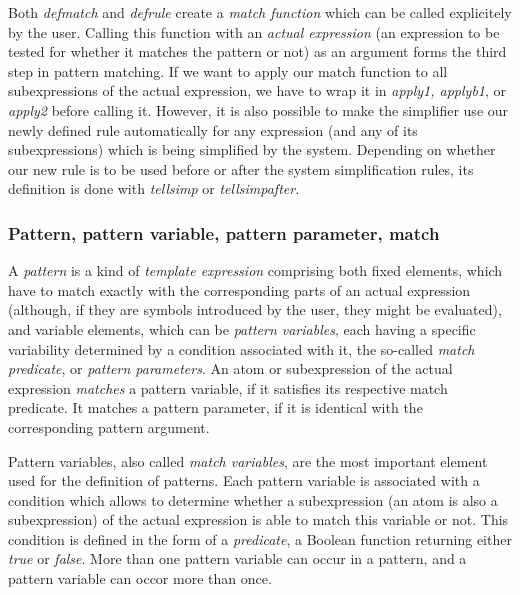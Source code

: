\documentclass[../Maxima_Workbook.tex]{subfiles}
\begin{document}
\lz Both \emph{defmatch} and \emph{defrule} create a \emph{match function} which can be called explicitely by the user. Calling this function with an \emph{actual expression} (an expression to be tested for whether it matches the pattern or not) as an argument forms the third step in pattern matching. If we want to apply our match function to all subexpressions of the actual expression, we have to wrap it in \emph{apply1, applyb1}, or \emph{apply2} before calling it. However, it is also possible to make the simplifier use our newly defined rule automatically for any expression (and any of its subexpressions) which is being simplified by the system. Depending on whether our new rule is to be used before or after the system simplification rules, its definition is done with \emph{tellsimp} or \emph{tellsimpafter}.

\subsubsection{Pattern, pattern variable, pattern parameter, match}

A \emph{pattern} is a kind of \emph{template expression} comprising both fixed elements, which have to match exactly with the corresponding parts of an actual expression (although, if they are symbols introduced by the user, they might be evaluated), and variable elements, which can be \emph{pattern variables}, each having a specific variability determined by a condition associated with it, the so-called \emph{match predicate}, or \emph{pattern parameters}. An atom or subexpression of the actual expression \emph{matches} a pattern variable, if it satisfies its respective match predicate. It matches a pattern parameter, if it is identical with the corresponding pattern argument.

\lz Pattern variables, also called \emph{match variables}, are the most important element used for the definition of patterns. Each pattern variable is associated with a condition which allows to determine whether a subexpression (an atom is also a subexpression) of the actual expression is able to match this variable or not. This condition is defined in the form of a \emph{predicate}, a Boolean function returning either \emph{true} or \emph{false}. More than one pattern variable can occur in a pattern, and a pattern variable can occor more than once. 
\end{document}
